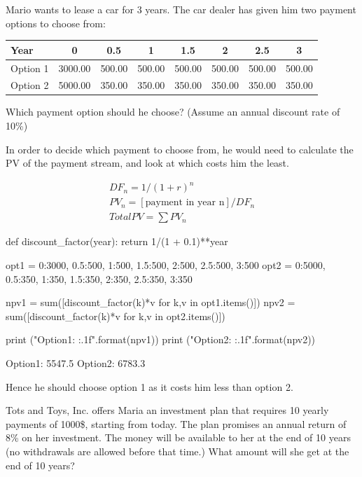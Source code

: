\cprotEnv\begin{question}
Mario wants to lease a car for 3 years. The car dealer has given him two payment options to choose from:
	
	\begin{table}[htbp]
		\centering
		\begin{tabular}{l|c|c|c|c|c|c|c}
			Year & 0 & 0.5 & 1 & 1.5 & 2 & 2.5 & 3 \\
			\hline
			Option 1 &	3000.00	& 500.00 & 500.00 &	500.00 & 500.00 & 500.00 & 500.00 \\
			\hline
			Option 2 &	5000.00	& 350.00 & 350.00 &	350.00 & 350.00 & 350.00 & 350.00 \\
		\end{tabular}
	\end{table}
\noindent
Which payment option should he choose? (Assume an annual discount rate of 10\%)
\end{question}

\cprotEnv\begin{solution}
In order to decide which payment to choose from, he would need to calculate the PV of the payment stream, and look at which costs him the least. 
	
\begin{gather*}
	DF_n = 1/(1 + r)^n \\
	PV_n = [\textrm{payment in year n}] / DF_n \\
	Total PV = \sum PV_n
\end{gather*}
	
\begin{ipython}
def discount_factor(year):
	return 1/(1 + 0.1)**year
		
opt1 = {0:3000, 0.5:500, 1:500, 1.5:500, 2:500, 2.5:500, 3:500}
opt2 = {0:5000, 0.5:350, 1:350, 1.5:350, 2:350, 2.5:350, 3:350}
		
npv1 = sum([discount_factor(k)*v for k,v in opt1.items()])
npv2 = sum([discount_factor(k)*v for k,v in opt2.items()])
		
print ("Option1: {:.1f}".format(npv1))
print ("Option2: {:.1f}".format(npv2))
\end{ipython}
\begin{ioutput}
Option1: 5547.5
Option2: 6783.3
\end{ioutput}
Hence he should choose option 1 as it costs him less than option 2.
\end{solution}

\begin{question}
Tots and Toys, Inc. offers Maria an investment plan that requires 10 yearly payments of 1000\$, starting from today. The plan promises an annual return of 8\% on her investment. The money will be available to her at the end of 10 years (no withdrawals are allowed before that time.) 
What amount will she get at the end of 10 years?
\end{question}

